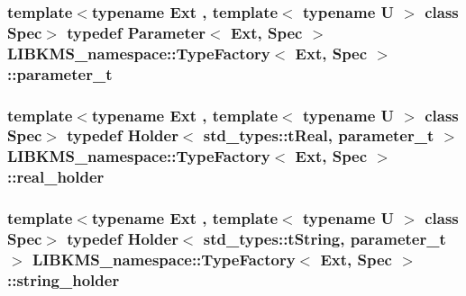 \hypertarget{classLIBKMS__namespace_1_1TypeFactory_a103a08b747cfe5b233b12c802b4563dc}{
\subsubsection[{parameter\-\_\-t}]{\setlength{\rightskip}{0pt plus 5cm}template$<$typename Ext , template$<$ typename U $>$ class Spec$>$ typedef {\bf Parameter}$<$ Ext, Spec $>$ {\bf L\-I\-B\-K\-M\-S\-\_\-namespace\-::\-Type\-Factory}$<$ Ext, Spec $>$\-::{\bf parameter\-\_\-t}}}\label{classLIBKMS__namespace_1_1TypeFactory_a103a08b747cfe5b233b12c802b4563dc}
\hypertarget{classLIBKMS__namespace_1_1TypeFactory_a789fcb94a8ce6dfd8b2ff0e9b4ce299c}{
\subsubsection[{real\-\_\-holder}]{\setlength{\rightskip}{0pt plus 5cm}template$<$typename Ext , template$<$ typename U $>$ class Spec$>$ typedef {\bf Holder}$<$ std\-\_\-types\-::t\-Real, {\bf parameter\-\_\-t} $>$ {\bf L\-I\-B\-K\-M\-S\-\_\-namespace\-::\-Type\-Factory}$<$ Ext, Spec $>$\-::{\bf real\-\_\-holder}}}\label{classLIBKMS__namespace_1_1TypeFactory_a789fcb94a8ce6dfd8b2ff0e9b4ce299c}
\hypertarget{classLIBKMS__namespace_1_1TypeFactory_a17b132ee9e501536bec342ed6377497a}{
\subsubsection[{string\-\_\-holder}]{\setlength{\rightskip}{0pt plus 5cm}template$<$typename Ext , template$<$ typename U $>$ class Spec$>$ typedef {\bf Holder}$<$ std\-\_\-types\-::t\-String, {\bf parameter\-\_\-t} $>$ {\bf L\-I\-B\-K\-M\-S\-\_\-namespace\-::\-Type\-Factory}$<$ Ext, Spec $>$\-::{\bf string\-\_\-holder}}}\label{classLIBKMS__namespace_1_1TypeFactory_a17b132ee9e501536bec342ed6377497a}
